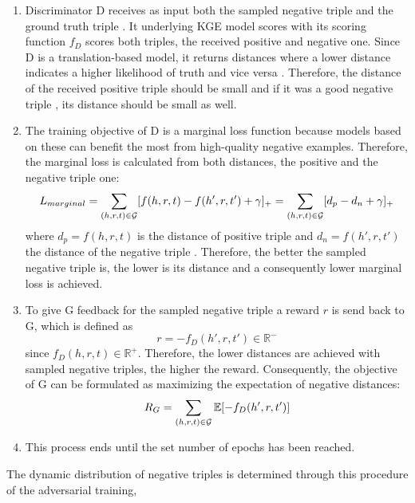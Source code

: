 \begin{enumerate}
    \item 
    Discriminator D receives as input both the sampled negative triple  and the ground truth triple .
    It underlying \ac{KGE} model scores with its scoring function $f_D$ scores both triples, the received positive and negative one.
    Since D is a translation-based model, it returns distances where a lower distance indicates a higher likelihood of truth and vice versa \cite{cai2017kbgan}.
    Therefore, the distance of the received positive triple  should be small and if it was a good negative triple , its distance should be small as well.
     
    \item 
    The training objective of D is a marginal loss function because models based on these can  benefit the most from high-quality negative examples.
    Therefore, the marginal loss is calculated from both distances, the positive and the negative triple one:
     \begin{equation}
        L_{marginal}
        =\sum_{(h,r,t)\in\mathcal{G}}[f(h,r,t)-f(h',r,t')+\gamma]_+ 
        = \sum_{(h,r,t)\in\mathcal{G}}[d_p-d_n+\gamma]_+ 
    \end{equation}
    where $d_p = f(h,r,t)$ is the distance of positive triple  and $d_n = f(h',r,t')$ the distance of the negative triple  .
    Therefore, the better the sampled negative triple is, the lower is its distance and a consequently lower marginal loss is achieved.
    
    \item 
    To give G feedback for the sampled negative triple  a reward $r$ is send back to G, which is defined as
    \begin{equation}
        r = -f_D(h',r,t') \in \mathbb{R}^-
    \end{equation}
    since $f_D(h,r,t) \in \mathbb{R}^+$.
    Therefore, the lower distances are achieved with sampled negative triples, the higher the reward.
    Consequently, the objective of G can be formulated as maximizing the expectation of negative distances:
    \begin{equation}
        R_G=\sum_{(h,r,t)\in\mathcal{G}}\mathbb{E}[-f_D(h',r,t')]
    \end{equation}
    
    \item
    This process ends until the set number of epochs has been reached.
    
\end{enumerate}
The dynamic distribution of negative triples is determined through this procedure of the adversarial training, 